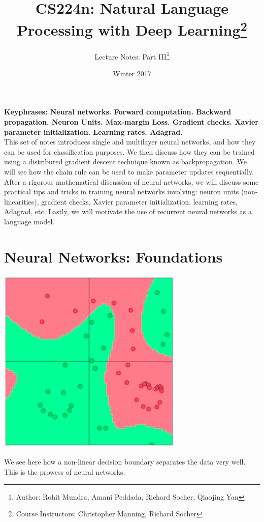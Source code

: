 \documentclass{tufte-handout}
\title{CS224n: Natural Language Processing with Deep Learning\thanks{Course Instructors: Christopher Manning, Richard Socher}}
\author[Rohit Mundra, Richard Socher]{Lecture Notes: Part III\thanks{Author: Rohit Mundra, Amani Peddada, Richard Socher,  Qiaojing Yan}}
\date{Winter 2017} %
\begin{document}
\maketitle%



\textbf{Keyphrases: Neural networks. Forward computation. Backward propagation. Neuron Units. Max-margin Loss. Gradient checks. Xavier parameter initialization. Learning rates. Adagrad.}\\

\noindent{}This set of notes introduces single and multilayer neural networks, and how they can be used for classification purposes. We then discuss how they can be trained using a distributed gradient descent technique known as backpropagation. We will see how the chain rule can be used to make parameter updates sequentially. After a rigorous mathematical discussion of neural networks, we will discuss some practical tips and tricks in training neural networks involving: neuron units (non-linearities), gradient checks, Xavier parameter initialization, learning rates, Adagrad, etc. Lastly, we will motivate the use of recurrent neural networks as a language model.

\section{Neural Networks: Foundations}\label{sec:nnets}

\begin{marginfigure}%
  \includegraphics[width=\linewidth]{NonlinearBoundary}
  \caption{We see here how a non-linear decision boundary separates the data very well. This is the prowess of neural networks.}
  \label{fig:NonlinearBoundary}
\end{marginfigure}
\end{document}
